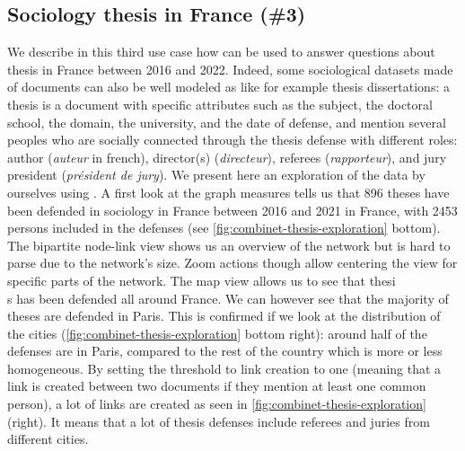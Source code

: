 \subsection{Sociology thesis in France (\#3)}

We describe in this third use case how \name can be used to answer questions about thesis in France between 2016 and 2022.
Indeed, some sociological datasets made of documents can also be well modeled as \modelplural like for example thesis dissertations: a thesis is a document with specific attributes such as the subject, the doctoral school, the domain, the university, and the date of defense, and mention several peoples who are socially connected through the thesis defense with different roles: author (\textit{auteur} in french), director(s) (\textit{directeur}), referees (\textit{rapporteur}), and jury president (\textit{président de jury}).
We present here an exploration of the data by ourselves using \name.
A first look at the graph measures tells us that 896 theses have been defended in sociology in France between 2016 and 2021 in France, with 2453 persons included in the defenses (see \autoref{fig:combinet-thesis-exploration} bottom).
The bipartite node-link view shows us an overview of the network but is hard to parse due to the network's size.
Zoom actions though allow centering the view for specific parts of the network.
The map view allows us to see that thesi\d\\s has been defended all around France.
We can however see that the majority of theses are defended in Paris.
This is confirmed if we look at the distribution of the cities (\autoref{fig:combinet-thesis-exploration} bottom right): around half of the defenses are in Paris, compared to the rest of the country which is more or less homogeneous.
By setting the threshold to link creation to one (meaning that a link is created between two documents if they mention at least one common person), a lot of links are created as seen in \autoref{fig:combinet-thesis-exploration} (right).
It means that a lot of thesis defenses include referees and juries from different cities.


